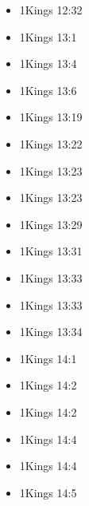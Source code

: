 \documentclass[14pt]{book}
\begin{document}
\begin{multicols}{2}
\begin{itemize}
											\item 1Kings 12:32
											
											\item 1Kings 13:1
											
											\item 1Kings 13:4
											
											\item 1Kings 13:6
											
											\item 1Kings 13:19
											
											\item 1Kings 13:22
											
											\item 1Kings 13:23
											
											\item 1Kings 13:23
											
											\item 1Kings 13:29
											
											\item 1Kings 13:31
											
											\item 1Kings 13:33
											
											\item 1Kings 13:33
											
											\item 1Kings 13:34
											
											\item 1Kings 14:1
											
											\item 1Kings 14:2
											
											\item 1Kings 14:2
											
											\item 1Kings 14:4
											
											\item 1Kings 14:4
											
											\item 1Kings 14:5
											

\end{itemize}
\end{multicols}
\end{document}
